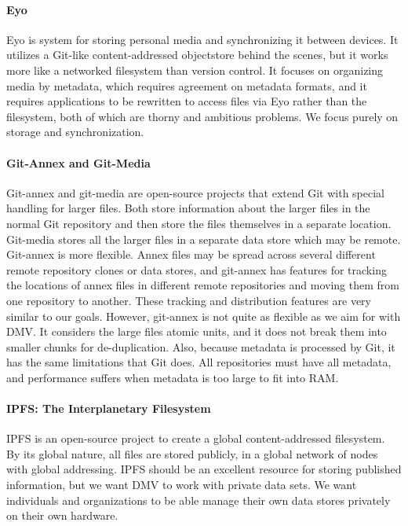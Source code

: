 \paragraph{Eyo}

Eyo \cite{Strauss:2011:EDP:2002181.2002216} is system for storing personal media
and synchronizing it between devices. It utilizes a Git-like content-addressed
\gls{objectstore} behind the scenes, but it works more like a networked filesystem
than version control. It focuses on organizing media by metadata, which requires
agreement on metadata formats, and it requires applications to be rewritten to
access files via Eyo rather than the filesystem, both of which are thorny and
ambitious problems. We focus purely on storage and synchronization.


\paragraph{Git-Annex and Git-Media}

Git-annex \cite{git_annex_homepage} and git-media \cite{git_media_github} are
open-source projects that extend Git with special handling for larger files.
Both store information about the larger files in the normal Git repository and
then store the files themselves in a separate location. Git-media stores all the
larger files in a separate data store which may be remote. Git-annex is more
flexible. Annex files may be spread across several different remote repository
clones or data stores, and git-annex has features for tracking the locations of
annex files in different remote repositories and moving them from one repository
to another. These tracking and distribution features are very similar to our
goals. However, git-annex is not quite as flexible as we aim for with \gls{DMV}.
It considers the large files atomic units, and it does not break them into
smaller chunks for de-duplication. Also, because metadata is processed by Git,
it has the same limitations that Git does. All repositories must have all
metadata, and performance suffers when metadata is too large to fit into RAM.


\paragraph{IPFS: The Interplanetary Filesystem}

IPFS \cite{ipfs_github_main} is an open-source project to create a global
content-addressed filesystem. By its global nature, all files are stored
publicly, in a global network of nodes with global addressing. IPFS should be an
excellent resource for storing published information, but we want \gls{DMV} to
work with private data sets. We want individuals and organizations to be able
manage their own data stores privately on their own hardware.

